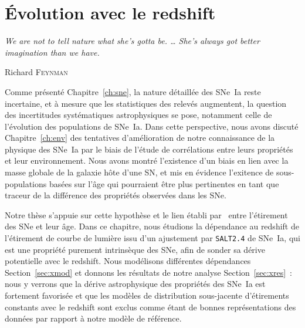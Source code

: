 \documentclass[../main/main.tex]{subfiles}
\begin{document}
\raggedbottom


\chapter{\'Evolution avec le redshift}\label{ch:stretch}
\epigraph{\openquote\textit{We are not to tell nature what she's gotta be. …
She's always got better imagination than we have.}\closequote}{Richard
\textsc{Feynman}}

Comme présenté Chapitre~\ref{ch:sne}, la nature détaillée des SNe~Ia reste
incertaine, et à mesure que les statistiques des relevés augmentent, la question
des incertitudes systématiques astrophysiques se pose, notamment celle de
l'évolution des populations de SNe~Ia. Dans cette perspective, nous avons
discuté Chapitre~\ref{ch:env} des tentatives d'amélioration de notre
connaissance de la physique des SNe~Ia par le biais de l'étude de corrélations
entre leurs propriétés et leur environnement. Nous avons montré l'existence d'un
biais en lien avec la masse globale de la galaxie hôte d'une SN, et mis en
évidence l'exitence de sous-populations basées sur l'âge qui pourraient être
plus pertinentes en tant que traceur de la différence des propriétés observées
dans les SNe.

Notre thèse s'appuie sur cette hypothèse et le lien établi
par~\cite{rigault2020} entre l'étirement des SNe et leur âge. Dans ce chapitre,
nous étudions la dépendance au redshift de l'étirement de courbe de lumière issu
d'un ajustement par \texttt{SALT2.4} de SNe~Ia, qui est une propriété purement
intrinsèque des SNe, afin de sonder sa dérive potentielle avec le redshift. Nous
modélisons différentes dépendances Section~\ref{sec:xmod} et donnons les
résultats de notre analyse Section~\ref{sec:xres}~: nous y verrons que la dérive
astrophysique des propriétés des SNe~Ia est fortement favorisée et que les
modèles de distribution sous-jacente d'étirements constants avec le redshift
sont exclus comme étant de bonnes représentations des données par rapport à
notre modèle de référence.

\vfill
\minitoc
\vfill

\clearpage

\thispagestyle{plain}
\vspace*{\fill}
\minilof
\vspace*{\fill}
\minilot
\vspace*{\fill}
\end{document}
